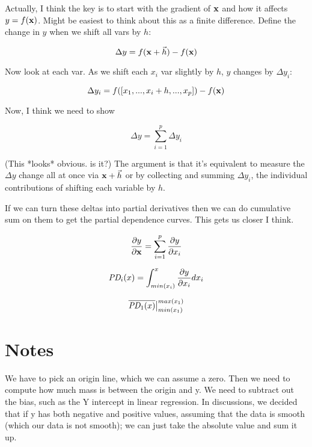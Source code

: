 \documentclass[12pt]{article}
\newcommand{\cut}[1]{}
\begin{document}
Actually, I think the key is to start with the gradient of ${\bf x}$ and how it affects $y=f({\bf x})$. Might be easiest to think about this as a finite difference. Define the change in $y$ when we shift all vars by $h$:

\[
\Delta y = f({\bf x} + \vec{h}) - f({\bf x})
\]

Now look at each var. As we shift each $x_i$ var slightly by $h$, $y$ changes by $\Delta y_i$:

\[
\Delta y_i = f([x_1, ..., x_i+h, ..., x_p]) - f({\bf x})
\]

Now, I think we need to show

\[
\Delta y = \sum_{i=1}^{p} \Delta y_i
\]

(This *looks* obvious. is it?) The argument is that it's equivalent to measure the $\Delta y$ change all at once via ${\bf x} + \vec{h}$ or by collecting and summing $\Delta y_i$, the individual contributions of shifting each variable by $h$.  

If we can turn these deltas into partial derivatives then we can do cumulative sum on them to get the partial dependence curves. This gets us closer I think.


\[
\frac{\partial y}{\partial \bf x} = \sum_{i=1}^p \frac{\partial y}{\partial x_i}
\]

\[
\text{\it PD}_i(x) = \int_{min(x_i)}^x \frac{\partial y}{\partial x_i} dx_i
\]

\[
\overline{\text{\it PD}_1(x)}\big |_{min(x_1)}^{max(x_1)}
\]

\cut{
\noindent At $x_i$ for some $h$ (maybe $h$ is instance index).

Define the gradient:

\[
\nabla {\bf x} = [\frac{\partial y}{\partial x_1}, \ldots, \frac{\partial y}{\partial x_p}]
\]

When we move from ${\bf x}$ to ${\bf x}+\nabla {\bf x}$, we add some $\Delta y$ to $y$ so

\[
f({\bf x}+\nabla {\bf x}) = y + \Delta y 
\]

I think we need to show

\[
\Delta y_i = \frac{f(x_i + h) - f(x_i)}{h}
\]

\[
\Delta y = \sum_{i=1}^{p} \Delta y_i
\]
}

\section{Notes}

We have to pick an origin line, which we can assume a zero. Then we need to compute how much mass is between the origin and y. We need to subtract out the bias, such as the Y intercept in linear regression.  In discussions, we decided that if y has both negative and positive values, assuming that the data is smooth (which our data is not smooth); we can just take the absolute value and sum it up. 
\end{document}
